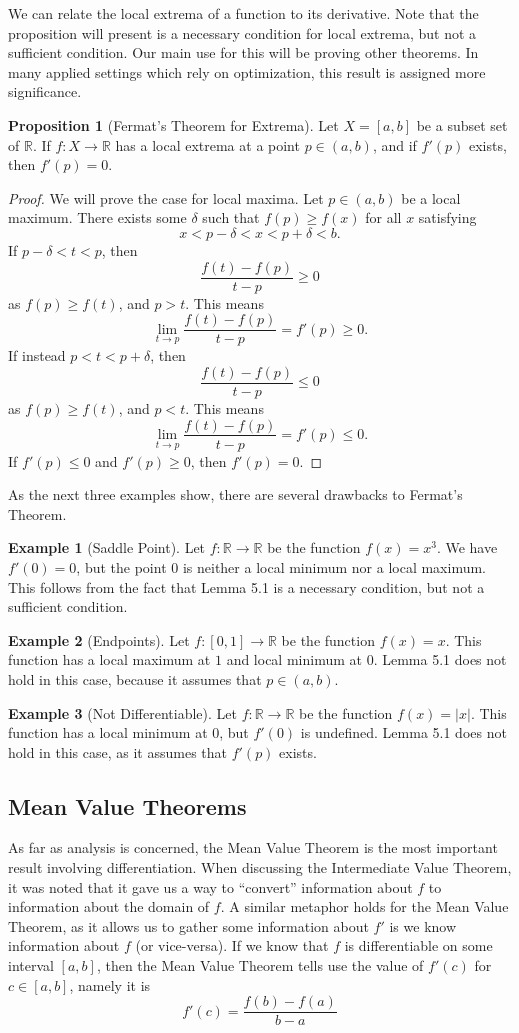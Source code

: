 \documentclass{article}
\newcommand{\R}{\mathbb{R}}
\theoremstyle{definition}
\newtheorem{proposition}{Proposition}[section]
\newtheorem{example}{Example}[section]
\begin{document}
We can relate the local extrema of a function to its derivative. Note that the proposition will present is a necessary condition for local extrema, but not a sufficient condition. Our main use for this will be proving other theorems. In many applied settings which rely on optimization, this result is assigned more significance. 
\begin{proposition}[Fermat's Theorem for Extrema]
Let $ X=[a,b] $ be a subset set of $ \R $. If $ f:X\to\R $ has a local extrema at a point $ p\in(a,b) $, and if $ f'(p) $ exists, then $ f'(p)=0 $.  
\end{proposition} 
\begin{proof}
	We will prove the case for local maxima. Let $ p\in (a,b) $ be a local maximum. There exists some $ \delta $ such that $ f(p)\ge f(x) $ for all $ x $ satisfying $$ x<p-\delta<x<p+\delta<b .$$
	If $ p-\delta<t<p $, then $$ \frac{f(t)-f(p)}{t-p}\ge 0$$ as $ f(p)\ge f(t)  $, and $ p>t $. This means $$ \lim_{t\to p}\frac{f(t)-f(p)}{t-p}=f'(p)\ge 0 .$$ 	If instead $ p<t<p+\delta $, then $$ \frac{f(t)-f(p)}{t-p}\le 0$$ as $ f(p)\ge f(t)  $, and $ p<t $. This means $$ \lim_{t\to p}\frac{f(t)-f(p)}{t-p}=f'(p)\le 0 .$$ If $ f'(p)\le 0 $ and $ f'(p)\ge 0 $, then $ f'(p)=0 $.
\end{proof}
As the next three examples show, there are several drawbacks to Fermat's Theorem.
\begin{example}[Saddle Point]
Let $ f:\R\to\R $ be the function $ f(x)=x^3 $. We have $ f'(0)=0 $, but the point $ 0 $ is neither a local minimum nor a local maximum. This follows from the fact that Lemma 5.1 is a necessary condition, but not a sufficient condition. 
\end{example}
\begin{example}[Endpoints]
Let $ f:[0,1]\to\R $ be the function $ f(x)=x $. This function has a local maximum at $ 1 $ and local minimum at $ 0 $. Lemma 5.1 does not hold in this case, because it assumes that $ p\in (a,b) $.
\end{example} 
\begin{example}[Not Differentiable]
Let $ f:\R\to\R $ be the function $ f(x)=|x| $. This function has a local minimum at $ 0 $, but $ f'(0)$ is undefined. Lemma 5.1 does not hold in this case, as it assumes that $ f'(p) $ exists.
\end{example} 
 
\subsection{Mean Value Theorems}
As far as analysis is concerned, the Mean Value Theorem is the most important result involving differentiation. When discussing the Intermediate Value Theorem, it was noted that it gave us a way to ``convert'' information about $ f $ to information about the domain of $ f $. A similar metaphor holds for the Mean Value Theorem, as it allows us to gather some information about $ f' $ is we know information about $ f $ (or vice-versa). If we know that $ f $ is differentiable on some interval $ [a,b] $, then the Mean Value Theorem tells use the value of $ f'(c) $ for $ c\in[a,b] $, namely it is $$f'(c)=\frac{f(b)-f(a)}{b-a} $$ 
\end{document}
